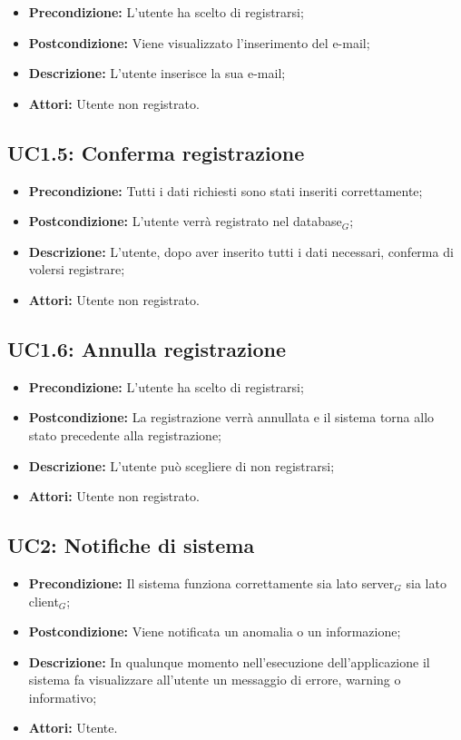 \begin{itemize}
	\item \textbf{Precondizione:} L'utente ha scelto di registrarsi;
	\item \textbf{Postcondizione:} Viene visualizzato l'inserimento del e-mail;
	\item \textbf{Descrizione:} L'utente inserisce la sua e-mail;
	\item \textbf{Attori:} Utente non registrato.
\end{itemize}
\subsection{ UC1.5: Conferma registrazione}

\begin{itemize}
	\item \textbf{Precondizione:} Tutti i dati richiesti sono stati inseriti correttamente;
	\item \textbf{Postcondizione:} L'utente verrà registrato nel database$_G$;
	\item \textbf{Descrizione:} L'utente, dopo aver inserito tutti i dati necessari, conferma di volersi registrare;
	\item \textbf{Attori:} Utente non registrato.
\end{itemize}
\subsection{ UC1.6: Annulla registrazione}

\begin{itemize}
	\item \textbf{Precondizione:} L'utente ha scelto di registrarsi;
	\item \textbf{Postcondizione:} La registrazione verrà annullata e il sistema torna allo stato precedente alla registrazione;
	\item \textbf{Descrizione:} L'utente può scegliere di non registrarsi;
	\item \textbf{Attori:} Utente non registrato.
\end{itemize}
\subsection{ UC2: Notifiche di sistema}

\begin{itemize}
	\item \textbf{Precondizione:} Il sistema funziona correttamente sia lato server$_G$ sia lato client$_G$;
	\item \textbf{Postcondizione:} Viene notificata un anomalia o un informazione;
	\item \textbf{Descrizione:} In qualunque momento nell'esecuzione dell'applicazione il sistema fa visualizzare all'utente un messaggio di errore, warning o informativo;
	\item \textbf{Attori:} Utente.
\end{itemize}
